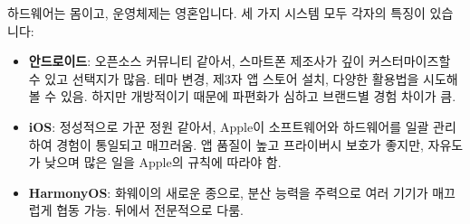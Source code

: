 
하드웨어는 몸이고, 운영체제는 영혼입니다. 세 가지 시스템 모두 각자의 특징이 있습니다:

\begin{itemize}
  \item \textbf{안드로이드}: 오픈소스 커뮤니티 같아서, 스마트폰 제조사가 깊이 커스터마이즈할 수 있고 선택지가 많음. 테마 변경, 제3자 앱 스토어 설치, 다양한 활용법을 시도해 볼 수 있음. 하지만 개방적이기 때문에 파편화가 심하고 브랜드별 경험 차이가 큼.
  \item \textbf{iOS}: 정성적으로 가꾼 정원 같아서, Apple이 소프트웨어와 하드웨어를 일괄 관리하여 경험이 통일되고 매끄러움. 앱 품질이 높고 프라이버시 보호가 좋지만, 자유도가 낮으며 많은 일을 Apple의 규칙에 따라야 함.
  \item \textbf{HarmonyOS}: 화웨이의 새로운 종으로, 분산 능력을 주력으로 여러 기기가 매끄럽게 협동 가능. 뒤에서 전문적으로 다룸.
\end{itemize}

